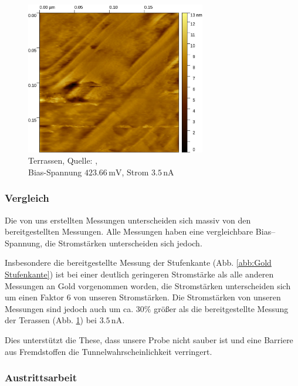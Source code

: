 \documentclass[12pt,a4paper]{scrartcl}
\numberwithin{equation}{section} %
\begin{document}
\begin{figure}[ht]
	\centering
	\includegraphics[width=0.7\textwidth]{../media/B2.5/Gold.pdf}
	\caption{Terrassen, Quelle: \cite{Grover}, \\
			Bias-Spannung $423.66 \mathrm{\,mV}$, Strom $3.5 \mathrm{\,nA}$}
	\label{abb:Gold terassen}
\end{figure}

\newpage
\hypertarget{vergleich}{%
\subsubsection{Vergleich}\label{vergleich}}

Die von uns erstellten Messungen unterscheiden sich massiv von den bereitgestellten Messungen. Alle Messungen haben eine vergleichbare Bias--Spannung, die Stromstärken unterscheiden sich jedoch.

Insbesondere die bereitgestellte Messung der Stufenkante (Abb. \ref{abb:Gold Stufenkante}) ist bei einer deutlich geringeren Stromstärke als alle anderen Messungen an Gold vorgenommen worden, die Stromstärken unterscheiden sich um einen Faktor $6$ von unseren Stromstärken. Die Stromstärken von unseren Messungen sind jedoch auch um ca. $30\%$ größer als die bereitgestellte Messung der Terassen (Abb. \ref{abb:Gold terassen}) bei $3.5 \mathrm{\,nA}$.

Dies unterstützt die These, dass unsere Probe nicht sauber ist und eine Barriere aus Fremdstoffen die Tunnelwahrscheinlichkeit verringert.

\hypertarget{austrittsarbeit-1}{%
\subsubsection{Austrittsarbeit}\label{austrittsarbeit-1}}
\end{document}
